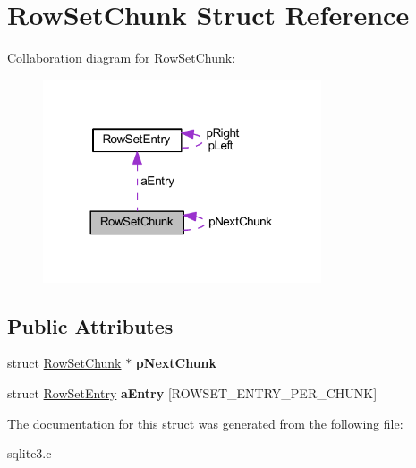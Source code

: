 \hypertarget{struct_row_set_chunk}{\section{Row\-Set\-Chunk Struct Reference}
\label{struct_row_set_chunk}
}


Collaboration diagram for Row\-Set\-Chunk\-:\nopagebreak
\begin{figure}[H]
\begin{center}
\leavevmode
\includegraphics[width=233pt]{struct_row_set_chunk__coll__graph}
\end{center}
\end{figure}
\subsection*{Public Attributes}
\begin{DoxyCompactItemize}
\item 
\hypertarget{struct_row_set_chunk_ae8f0975c86633ae2bb8b212d3a767554}{struct \hyperlink{struct_row_set_chunk}{Row\-Set\-Chunk} $\ast$ {\bfseries p\-Next\-Chunk}}\label{struct_row_set_chunk_ae8f0975c86633ae2bb8b212d3a767554}

\item 
\hypertarget{struct_row_set_chunk_abde97bbb07c3bf9454e719ff860bdd1f}{struct \hyperlink{struct_row_set_entry}{Row\-Set\-Entry} {\bfseries a\-Entry} \mbox{[}R\-O\-W\-S\-E\-T\-\_\-\-E\-N\-T\-R\-Y\-\_\-\-P\-E\-R\-\_\-\-C\-H\-U\-N\-K\mbox{]}}\label{struct_row_set_chunk_abde97bbb07c3bf9454e719ff860bdd1f}

\end{DoxyCompactItemize}


The documentation for this struct was generated from the following file\-:\begin{DoxyCompactItemize}
\item 
sqlite3.\-c\end{DoxyCompactItemize}
